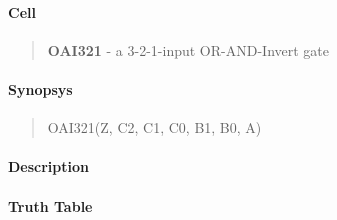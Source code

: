 \label{OAI321}
\paragraph{Cell}
\begin{quote}
    \textbf{OAI321} - a 3-2-1-input OR-AND-Invert gate
\end{quote}

\paragraph{Synopsys}
\begin{quote}
    OAI321(Z, C2, C1, C0, B1, B0, A)
\end{quote}

\paragraph{Description}



\paragraph{Truth Table}


